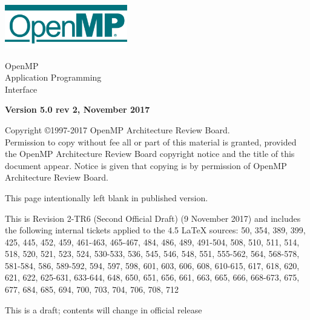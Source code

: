 
  \begin{titlepage}
    \begin{flushleft}
     \hspace{-6em} \includegraphics[width=0.4\textwidth]{openmp-logo.png}
    \end{flushleft}

    \begin{adjustwidth}{-0.75in}{0in}
    \begin{center}
      \Huge
      \textsf{OpenMP\\Application Programming\\Interface}

      \vspace{0.5in}\textsf{    }\vspace{-0.7in}
      \normalsize

      \vspace{1.0in}

      \textbf{Version 5.0 rev 2, November 2017}
    \end{center}
    \end{adjustwidth}

    \vspace{3.0in}

\begin{adjustwidth}{0pt}{1em}\setlength{\parskip}{0.25\baselineskip}%
Copyright \copyright 1997-2017 OpenMP Architecture Review Board.\\
Permission to copy without fee all or part of this material is granted,
provided the OpenMP Architecture Review Board copyright notice and
the title of this document appear. Notice is given that copying is by
permission of OpenMP Architecture Review Board.\end{adjustwidth}

  \end{titlepage}


\clearpage
\thispagestyle{empty}
\phantom{a}
This page intentionally left blank in published version.

This is Revision 2-TR6 (Second Official Draft) (9 November 2017) and
includes the following internal tickets applied to the 4.5 LaTeX sources:
50, 354, 389, 399, 425, 445, 452, 459, 461-463, 465-467, 484, 486, 489, 
491-504, 508, 510, 511, 514, 518, 520, 521, 523, 524, 530-533, 536, 545, 
546, 548, 551, 555-562, 564, 568-578, 581-584, 586, 589-592, 594, 597, 598,
601, 603, 606, 608, 610-615, 617, 618, 620, 621, 622, 625-631, 633-644, 
648, 650, 651, 656, 661, 663, 665, 666, 668-673, 675, 677, 684, 685, 694,
700, 703, 704, 706, 708, 712

This is a draft; contents will change in official release

\vfill

